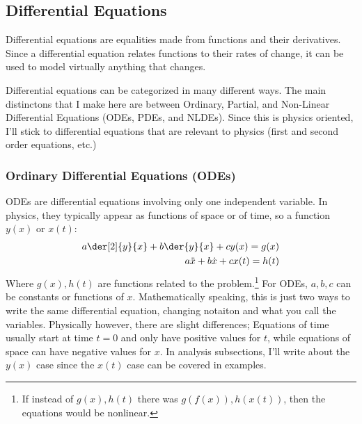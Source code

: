 \setlength{\columnseprule}{1pt}
\subsection{Differential Equations} 
    Differential equations are equalities made from functions and their derivatives. Since a differential equation relates  functions to their rates of change, it can be used to model virtually anything that changes. 
    \par
    Differential equations can be categorized in many different ways. The main distinctons that I make here are between Ordinary, Partial, and Non-Linear Differential Equations (ODEs, PDEs, and NLDEs). Since this is physics oriented, I'll stick to differential equations that are relevant to physics (first and second order equations, etc.)
\par
%

\subsubsection{Ordinary Differential Equations (ODEs)}
    ODEs are differential equations involving only one independent variable. In physics, they typically appear as functions of space or of time, so a function $y(x)$ or $x(t)$: 
    \begin{align}
        a\der[2]{y}{x}+b\der{y}{x}+cy(x)=g(x)\label{eqn:ode}
        \\
        a\Ddot{x}+b\dot{x}+cx(t)=h(t)\notag
    \end{align}
    Where $g(x),h(t)$ are functions related to the problem.\footnote{If instead of $g(x),h(t)$ there was $g(f(x)),h(x(t))$, then the equations would be nonlinear.} For ODEs, $a,b,c$ can be constants or functions of $x$. Mathematically speaking, this is just two ways to write the same differential equation, changing notaiton and what you call the variables. Physically however, there are slight differences; Equations of time usually start at time $t=0$ and only have positive values for $t$, while equations of space can have negative values for $x$. In analysis subsections, I'll write about the $y(x)$ case since the $x(t)$ case can be covered in examples.
